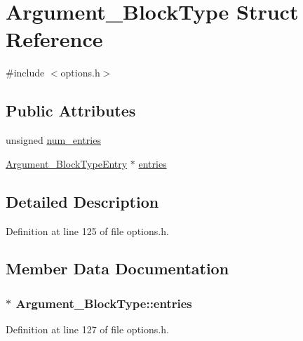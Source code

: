\hypertarget{struct_argument___block_type}{}\section{Argument\+\_\+\+Block\+Type Struct Reference}
\label{struct_argument___block_type}


{\ttfamily \#include $<$options.\+h$>$}

\subsection*{Public Attributes}
\begin{DoxyCompactItemize}
\item 
unsigned \hyperlink{struct_argument___block_type_afc3c04eb2873d0631d2f575ed12b2bde}{num\+\_\+entries}
\item 
\hyperlink{struct_argument___block_type_entry}{Argument\+\_\+\+Block\+Type\+Entry} $\ast$ \hyperlink{struct_argument___block_type_a916868f0790b87bf9bb3bfb4c8032593}{entries}
\end{DoxyCompactItemize}


\subsection{Detailed Description}


Definition at line 125 of file options.\+h.



\subsection{Member Data Documentation}
\subsubsection[{\texorpdfstring{entries}{entries}}]{$\ast$ Argument\+\_\+\+Block\+Type\+::entries}\hypertarget{struct_argument___block_type_a916868f0790b87bf9bb3bfb4c8032593}{}\label{struct_argument___block_type_a916868f0790b87bf9bb3bfb4c8032593}


Definition at line 127 of file options.\+h.

